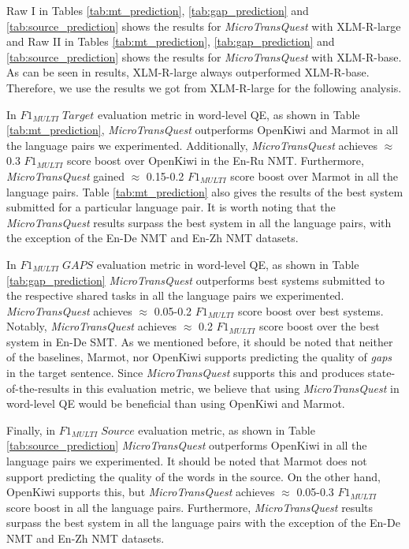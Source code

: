 Raw I in Tables \ref{tab:mt_prediction}, \ref{tab:gap_prediction} and \ref{tab:source_prediction} shows the results for \textit{MicroTransQuest} with XLM-R-large and Raw II in Tables  \ref{tab:mt_prediction}, \ref{tab:gap_prediction} and \ref{tab:source_prediction} shows the results for \textit{MicroTransQuest} with XLM-R-base. As can be seen in results, XLM-R-large always outperformed XLM-R-base. Therefore, we use the results we got from XLM-R-large for the following analysis.
 
In $F1_{\textit{MULTI}} \; Target$ evaluation metric in word-level QE, as shown in Table \ref{tab:mt_prediction}, \textit{MicroTransQuest} outperforms OpenKiwi and Marmot in all the language pairs we experimented. Additionally, \textit{MicroTransQuest} achieves $\approx$ 0.3 $F1_{\textit{MULTI}}$ score boost over OpenKiwi in the En-Ru NMT. Furthermore, \textit{MicroTransQuest} gained $\approx$ 0.15-0.2 $F1_{\textit{MULTI}}$ score boost over Marmot in all the language pairs. Table \ref{tab:mt_prediction}  also gives the results of the best system submitted for a particular language pair. It is worth noting that the \textit{MicroTransQuest} results surpass the best system in all the language pairs, with the exception of the En-De NMT and En-Zh NMT datasets.
 
 In $F1_{\textit{MULTI}} \; GAPS$ evaluation metric in word-level QE, as shown in Table \ref{tab:gap_prediction} \textit{MicroTransQuest} outperforms best systems submitted to the respective shared tasks in all the language pairs we experimented. \textit{MicroTransQuest} achieves $\approx$ 0.05-0.2 $F1_{\textit{MULTI}}$ score boost over best systems. Notably, \textit{MicroTransQuest} achieves $\approx$ 0.2 $F1_{\textit{MULTI}}$ score boost over the best system in En-De SMT. As we mentioned before, it should be noted that neither of the baselines, Marmot, nor OpenKiwi supports predicting the quality of \textit{gaps} in the target sentence. Since \textit{MicroTransQuest} supports this and produces state-of-the-results in this evaluation metric, we believe that using \textit{MicroTransQuest} in word-level QE would be beneficial than using OpenKiwi and Marmot.
 
Finally, in $F1_{\textit{MULTI}} \; Source$ evaluation metric, as shown in Table \ref{tab:source_prediction} \textit{MicroTransQuest} outperforms OpenKiwi in all the language pairs we experimented. It should be noted that Marmot does not support predicting the quality of the words in the source. On the other hand, OpenKiwi supports this, but \textit{MicroTransQuest} achieves $\approx$ 0.05-0.3 $F1_{\textit{MULTI}}$ score boost in all the language pairs. Furthermore, \textit{MicroTransQuest} results surpass the best system in all the language pairs with the exception of the En-De NMT and En-Zh NMT datasets.

